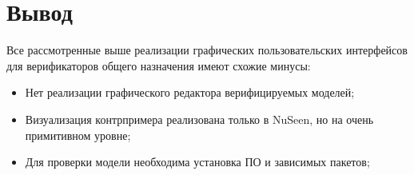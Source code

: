 \section{Вывод}

Все рассмотренные выше реализации графических пользовательских интерфейсов для верификаторов общего назначения имеют схожие минусы:
\begin{itemize}
	\item Нет реализации графического редактора верифицируемых моделей;
	\item Визуализация контрпримера реализована только в NuSeen, но на очень примитивном уровне;
	\item Для проверки модели необходима установка ПО и зависимых пакетов;
\end{itemize}
